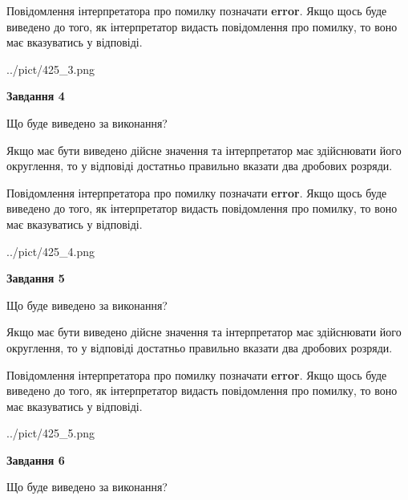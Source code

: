 \documentclass[12pt, ukrainian]{article}
\begin{document}
{\begin {Large}
Повідомлення інтерпретатора про помилку позначати \textbf{error}.
Якщо щось буде виведено до того, як інтерпретатор видасть повідомлення про помилку, 
то воно має вказуватись у відповіді. \par

\begin{center}
	{../pict/425_3.png}
\end{center}
\newpage

{\begin {center}\textbf{Завдання 4}\end {center}}\par
Що буде виведено за виконання? \par

Якщо має бути виведено дійсне значення та інтерпретатор має здійснювати його округлення, 
то у відповіді достатньо правильно вказати два дробових розряди.

Повідомлення інтерпретатора про помилку позначати \textbf{error}.
Якщо щось буде виведено до того, як інтерпретатор видасть повідомлення про помилку, 
то воно має вказуватись у відповіді. \par

\begin{center}
	{../pict/425_4.png}
\end{center}
\newpage

{\begin {center}\textbf{Завдання 5}\end {center}}\par
Що буде виведено за виконання? \par

Якщо має бути виведено дійсне значення та інтерпретатор має здійснювати його округлення, 
то у відповіді достатньо правильно вказати два дробових розряди.

Повідомлення інтерпретатора про помилку позначати \textbf{error}.
Якщо щось буде виведено до того, як інтерпретатор видасть повідомлення про помилку, 
то воно має вказуватись у відповіді. \par

\begin{center}
	{../pict/425_5.png}
\end{center}
\newpage

{\begin {center}\textbf{Завдання 6}\end {center}}\par
Що буде виведено за виконання? \par


\end{Large}}
\end{document}
